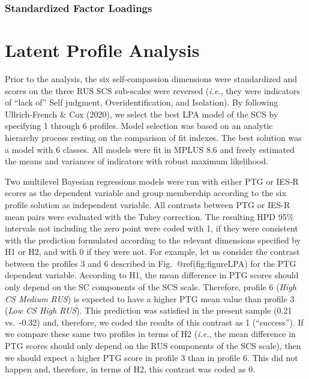 \begin{appendix}
\newpage

\hypertarget{standardized-factor-loadings-3}{%
\subsubsection{Standardized Factor
Loadings}\label{standardized-factor-loadings-3}}



\newpage

\hypertarget{latent-profile-analysis}{%
\section{Latent Profile Analysis}\label{latent-profile-analysis}}

Prior to the analysis, the six self-compassion dimensions were
standardized and scores on the three RUS SCS sub-scales were reversed
(\emph{i.e.}, they were indicators of ``lack of'' Self judgment,
Overidentification, and Isolation). By following Ullrich-French \& Cox
(2020), we select the best LPA model of the SCS by specifying 1 through
6 profiles. Model selection was based on an analytic hierarchy process
resting on the comparison of fit indexes. The best solution was a model
with 6 classes. All models were fit in MPLUS 8.6 and freely estimated
the means and variances of indicators with robust maximum likelihood.

Two multilevel Bayesian regressions models were run with either PTG or
IES-R scores as the dependent variable and group membership according to
the six profile solution as independent variable. All contrasts between
PTG or IES-R mean pairs were evaluated with the Tukey correction. The
resulting HPD 95\% intervals not including the zero point were coded
with 1, if they were consistent with the prediction formulated according
to the relevant dimensions specified by H1 or H2, and with 0 if they
were not. For example, let us consider the contrast between the profiles
3 and 6 described in Fig.~@ref(fig:figureLPA) for the PTG dependent
variable. According to H1, the mean difference in PTG scores should only
depend on the SC components of the SCS scale. Therefore, profile 6
(\emph{High CS Medium RUS}) is expected to have a higher PTG mean value
than profile 3 (\emph{Low CS High RUS}). This prediction was satisfied
in the present sample (0.21 vs.~-0.32) and, therefore, we coded the
results of this contrast as 1 (``success''). If we compare these same
two profiles in terms of H2 (\emph{i.e.}, the mean difference in PTG
scores should only depend on the RUS components of the SCS scale), then
we should expect a higher PTG score in profile 3 than in profile 6. This
did not happen and, therefore, in terms of H2, this contrast was coded
as 0.


\end{appendix}
